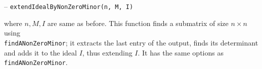 \documentclass[11pt]{amsart}
\theoremstyle{definition}
\begin{document}
\vspace{0.5em}
-- {\tt extendIdealByNonZeroMinor(n, M, I)} 

\vspace{0.5em}
\noindent where $n,M,I$ are same as before. This function finds a submatrix of size $n\times n$ using \\{\tt findANonZeroMinor};  
it extracts the last entry of the output, finds its determinant and
adds it to the ideal $I$, thus extending $I$.   It has the same options as {\tt findANonZeroMinor}.




\begin{comment}~~
  
  ~~
  
  {{\small\color{blue}
\begin{verbatim}
i2 : R = ZZ/5[x, y, z];

i3 : I = ideal(random(3, R) - 2, random(2, R))

                3    2       2     3     2              2       2     3
o3 = ideal (- 2x  + x y - x*y  - 2y  - 2x z + 2x*y*z + y z + y*z  - 2z 
-------------------------------------------------------------------
         2            2                 2
- 2, - 2x  - 2x*y + 2y  + x*z - 2y*z - z )

o3 : Ideal of R

i4 : M = jacobian(I)

o4 = {1} | -x2+2xy-y2+xz+2yz    x-2y+z   |
     {1} | x2-2xy-y2+2xz+2yz+z2 -2x-y-2z |
     {1} | -2x2+2xy+y2+2yz-z2   x-2y-2z  |

             3       2
o4 : Matrix R  <--- R

i5 : extendIdealByNonZeroMinor(2, M, I, Strategy => LinearIntersection)

                3    2       2     3     2              2       2     3
o5 = ideal (- 2x  + x y - x*y  - 2y  - 2x z + 2x*y*z + y z + y*z  - 2z 
-------------------------------------------------------------------
         2            2                 2   3    2        2    3  
- 2, - 2x  - 2x*y + 2y  + x*z - 2y*z - z , x  + x y + 2x*y  - y  +
-------------------------------------------------------------------
  2       2    3
2x z + y*z  - z )

o5 : Ideal of R
\end{verbatim}}	
    }}	
\end{comment}
\end{document}
